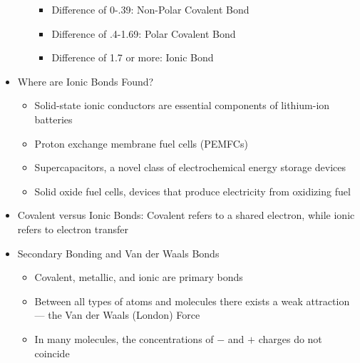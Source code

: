 \begin{itemize}
\begin{itemize}
        \begin{itemize}

          \item Difference of 0-.39: Non-Polar Covalent Bond

          \item Difference of .4-1.69: Polar Covalent Bond

          \item Difference of 1.7 or more: Ionic Bond

        \end{itemize}

    \end{itemize}

  \item Where are Ionic Bonds Found?

    \begin{itemize}

      \item Solid-state ionic conductors are essential components of lithium-ion batteries

      \item Proton exchange membrane fuel cells (PEMFCs)

      \item Supercapacitors, a novel class of electrochemical energy storage devices

      \item Solid oxide fuel cells, devices that produce electricity from oxidizing fuel

    \end{itemize}

  \item Covalent versus Ionic Bonds: Covalent refers to a shared electron, while ionic refers to electron transfer

  \item Secondary Bonding and Van der Waals Bonds

    \begin{itemize}

      \item Covalent, metallic, and ionic are primary bonds

      \item Between all types of atoms and molecules there exists a weak attraction — the Van der Waals (London) Force

      \item In many molecules, the concentrations of $-$ and $+$ charges do not coincide


\end{itemize}
\end{itemize}
